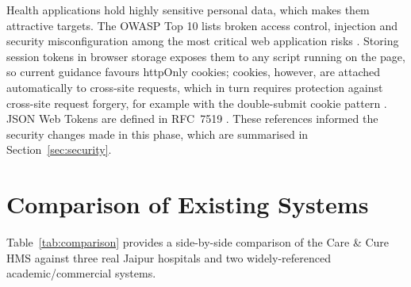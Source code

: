 Health applications hold highly sensitive personal data, which makes them attractive targets. The OWASP Top 10 lists broken access control, injection and security misconfiguration among the most critical web application risks \cite{owasp2021}. Storing session tokens in browser storage exposes them to any script running on the page, so current guidance favours httpOnly cookies; cookies, however, are attached automatically to cross-site requests, which in turn requires protection against cross-site request forgery, for example with the double-submit cookie pattern \cite{owaspcsrf}. JSON Web Tokens are defined in RFC~7519 \cite{rfc7519}. These references informed the security changes made in this phase, which are summarised in Section~\ref{sec:security}.

\FloatBarrier
\section{Comparison of Existing Systems}

Table~\ref{tab:comparison} provides a side-by-side comparison of the Care \& Cure HMS against three real Jaipur hospitals and two widely-referenced academic/commercial systems.

